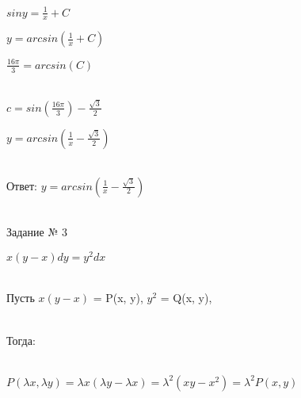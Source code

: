 \documentclass{article}
\begin{document}
\begin{flushleft}
    $siny = \frac{1}{x} + C$
\end{flushleft}

\begin{flushleft}
   $y = arcsin(\frac{1}{x} + C)$
\end{flushleft}

\begin{flushleft}
   $\frac{16\pi}{3} = arcsin(C)$\\\\
\end{flushleft}

\begin{flushleft}
   $c = sin(\frac{16\pi}{3}) - \frac{\sqrt{3}}{2}$
\end{flushleft}

\begin{flushleft}
   $y = arcsin(\frac{1}{x} - \frac{\sqrt{3}}{2})$\\\\
\end{flushleft}

\begin{center}
    Ответ: $y = arcsin(\frac{1}{x} - \frac{\sqrt{3}}{2})$\\\\
\end{center}

\begin{center}
    Задание № 3
\end{center}

\begin{center}
    $x(y-x)dy = y^{2}dx$\\\\
\end{center}

\begin{center}
    Пусть $x(y-x)$ = P(x, y), $y^2$ = Q(x, y),\\\\
\end{center}

\begin{center}
    Тогда:\\\\
\end{center}

\begin{flushleft}
    $P(\lambda x, \lambda y) = \lambda x (\lambda y - \lambda x) = \lambda^2 (xy - x^2) = \lambda^2 P(x, y)$
\end{flushleft}
\end{document}
